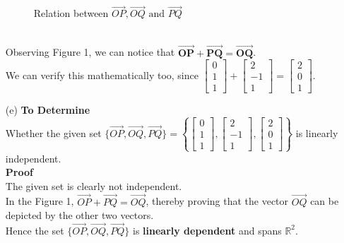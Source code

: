 \documentclass[11pt]{article}
\begin{document}
\begin{enumerate}[label=(\alph*)]
\begin{figure}[htp]
\begin{center}
\end{center}
\caption{Relation between $\overrightarrow{OP}, \overrightarrow{OQ} \text{ and } \overrightarrow{PQ}$} \label{Fig 1.}
\end{figure}\bigskip
\\Observing Figure 1, we can notice that $\boldsymbol{\overrightarrow{OP} + \overrightarrow{PQ} = \overrightarrow{OQ}}$.
\bigskip
\\ We can verify this mathematically too, since $
\begin{bmatrix}
0 \\ 1 \\ 1
\end{bmatrix} 
+
\begin{bmatrix}
2 \\ -1 \\ 1
\end{bmatrix} 
= 
\begin{bmatrix}
2 \\ 0 \\ 1
\end{bmatrix}.
$
    
    \item [(e)]
    \textbf{To Determine} \medskip \\
Whether the given set $\{\overrightarrow{OP}, \overrightarrow{OQ} , \overrightarrow{PQ}\} = \left\{
  \begin{bmatrix}
   0 \\ 1 \\ 1
   \end{bmatrix}
   ,\begin{bmatrix}
   2 \\ -1 \\ 1
   \end{bmatrix}
   ,
   \begin{bmatrix}
   2 \\ 0 \\ 1
   \end{bmatrix} \right\}$ is linearly independent.
\bigskip
\\
\textbf{Proof} 
\\
The given set is clearly not independent. \\ In the Figure 1, $\overrightarrow{OP} + \overrightarrow{PQ} = \overrightarrow{OQ}$, thereby proving that the vector $\overrightarrow{OQ}$ can be depicted by the other two vectors.\medskip
\\
Hence the set $\{\overrightarrow{OP}, \overrightarrow{OQ}, \overrightarrow{PQ}\}$ is \textbf{linearly dependent} and spans $\mathbb{R}^2$.
   
   \end{enumerate}
   
\end{document}

